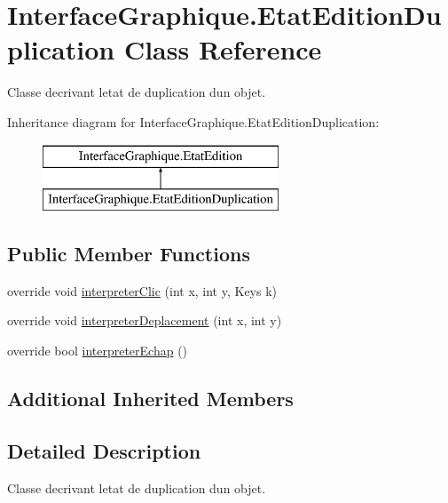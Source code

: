 \hypertarget{class_interface_graphique_1_1_etat_edition_duplication}{}\section{Interface\+Graphique.\+Etat\+Edition\+Duplication Class Reference}
\label{class_interface_graphique_1_1_etat_edition_duplication}


Classe decrivant l\textquotesingle{}etat de duplication d\textquotesingle{}un objet.  


Inheritance diagram for Interface\+Graphique.\+Etat\+Edition\+Duplication\+:\begin{figure}[H]
\begin{center}
\leavevmode
\includegraphics[height=2.000000cm]{class_interface_graphique_1_1_etat_edition_duplication}
\end{center}
\end{figure}
\subsection*{Public Member Functions}
\begin{DoxyCompactItemize}
\item 
override void \hyperlink{group__inf2990_ga798fb4efadd7939ccf925d0aafb70492}{interpreter\+Clic} (int x, int y, Keys k)
\item 
override void \hyperlink{group__inf2990_gab2a60a3e707358497925df99b483cae0}{interpreter\+Deplacement} (int x, int y)
\item 
override bool \hyperlink{group__inf2990_gad2a0ed82508e947c24ffe99b78280b63}{interpreter\+Echap} ()
\end{DoxyCompactItemize}
\subsection*{Additional Inherited Members}


\subsection{Detailed Description}
Classe decrivant l\textquotesingle{}etat de duplication d\textquotesingle{}un objet. 

